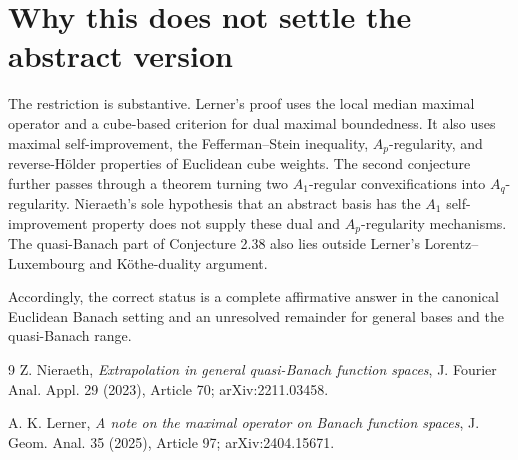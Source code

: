 \documentclass[11pt]{article}
\begin{document}
\section*{Why this does not settle the abstract version}

The restriction is substantive.  Lerner's proof uses the local median maximal
operator and a cube-based criterion for dual maximal boundedness.  It also uses
maximal self-improvement, the Fefferman--Stein inequality, $A_p$-regularity,
and reverse-H\"older properties of Euclidean cube weights.  The second
conjecture further passes through a theorem turning two $A_1$-regular
convexifications into $A_q$-regularity.  Nieraeth's sole hypothesis that an
abstract basis has the $A_1$ self-improvement property does not supply these
dual and $A_p$-regularity mechanisms.  The quasi-Banach part of Conjecture 2.38
also lies outside Lerner's Lorentz--Luxembourg and K\"othe-duality argument.

Accordingly, the correct status is a complete affirmative answer in the
canonical Euclidean Banach setting and an unresolved remainder for general
bases and the quasi-Banach range.

\begin{thebibliography}{9}
Z. Nieraeth,
\emph{Extrapolation in general quasi-Banach function spaces},
J. Fourier Anal. Appl. 29 (2023), Article 70; arXiv:2211.03458.

A. K. Lerner,
\emph{A note on the maximal operator on Banach function spaces},
J. Geom. Anal. 35 (2025), Article 97; arXiv:2404.15671.
\end{thebibliography}
\end{document}
